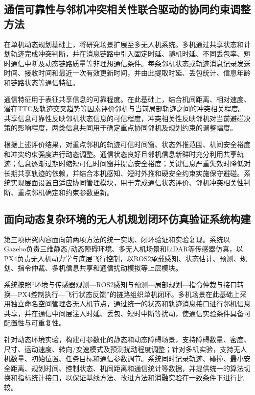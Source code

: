 \subsection{通信可靠性与邻机冲突相关性联合驱动的协同约束调整方法}

在单机动态规划基础上，将研究场景扩展至多无人机系统。多机通过共享状态和计划轨迹完成冲突判断，并在消息链路中引入固定时延、随机时延、不同丢包率、短时通信中断及动态链路质量等非理想通信条件。每条邻机状态或轨迹消息记录发送时间、接收时间和最近一次有效更新时间，并由此提取时延、丢包统计、信息年龄和链路状态等通信特征。

通信特征用于表征共享信息的可靠程度。在此基础上，结合机间距离、相对速度、潜在TTC及轨迹交叉趋势等因素评价邻机与当前局部轨迹之间的冲突相关程度。共享信息可靠性反映邻机状态信息的可信程度，冲突相关性反映邻机对当前避碰决策的影响程度，两类信息共同用于确定重点协同邻机及规划约束的调整幅度。

根据上述评价结果，对重点邻机的轨迹可信时间窗、状态外推范围、机间安全裕度和冲突约束强度进行动态调整。通信状态良好且邻机信息新鲜时充分利用共享轨迹；信息逐渐过期时缩短可信时间窗并提高安全裕度；关键信息严重失效时降低对长期共享轨迹的依赖，并结合本机感知、短时外推和硬安全约束实施保守避碰。系统实现层面设置自适应协同管理模块，用于完成通信状态评价、邻机冲突相关性判断、重点邻机确定和约束参数更新。

\subsection{面向动态复杂环境的无人机规划闭环仿真验证系统构建}

第三项研究内容面向前两项方法的统一实现、闭环验证和实验复现。系统以Gazebo负责三维静态/动态障碍环境、多无人机场景和LiDAR等传感器仿真，以PX4负责无人机动力学与底层飞行控制，以ROS2承载感知、状态估计、预测、规划、指令仲裁、多机信息共享和通信扰动模拟等上层模块。

系统按照“环境与传感器观测—ROS2感知与预测—局部规划—指令仲裁与接口转换—PX4控制执行—飞行状态反馈”的链路组织单机闭环。多机场景在此基础上采用独立命名空间管理各无人机节点，通过统一的状态和轨迹消息接口进行邻机信息共享，并在通信中间层注入时延、丢包、短时中断等扰动，使通信实验条件具备可配置性与可重复性。

针对动态环境实验，构建可参数化的静态和动态障碍场景，支持障碍数量、密度、尺寸、运动速度、转向/变速模式及预测扰动程度调整；针对多机实验，支持无人机数量、初始位置、任务目标和通信参数调节。系统同时记录轨迹、碰撞、最小安全距离、规划时间、控制状态、机间距离和通信统计等数据，并提供统一的算法切换和指标统计接口，以保证基线方法、改进方法和消融实验在一致条件下进行比较。

